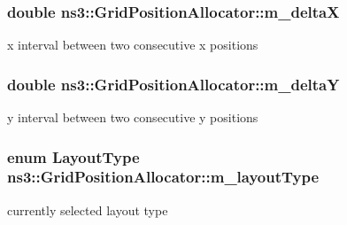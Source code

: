 \subsubsection[{\texorpdfstring{m\+\_\+deltaX}{m_deltaX}}]{\setlength{\rightskip}{0pt plus 5cm}double ns3\+::\+Grid\+Position\+Allocator\+::m\+\_\+deltaX\hspace{0.3cm}{\ttfamily [private]}}\hypertarget{classns3_1_1GridPositionAllocator_a09ae12ea1721ea8c9ad0ac2ea268560e}{}\label{classns3_1_1GridPositionAllocator_a09ae12ea1721ea8c9ad0ac2ea268560e}


x interval between two consecutive x positions 

\subsubsection[{\texorpdfstring{m\+\_\+deltaY}{m_deltaY}}]{\setlength{\rightskip}{0pt plus 5cm}double ns3\+::\+Grid\+Position\+Allocator\+::m\+\_\+deltaY\hspace{0.3cm}{\ttfamily [private]}}\hypertarget{classns3_1_1GridPositionAllocator_a1e266d88a85f5cf399e5ff5762c23b83}{}\label{classns3_1_1GridPositionAllocator_a1e266d88a85f5cf399e5ff5762c23b83}


y interval between two consecutive y positions 

\subsubsection[{\texorpdfstring{m\+\_\+layout\+Type}{m_layoutType}}]{\setlength{\rightskip}{0pt plus 5cm}enum {\bf Layout\+Type} ns3\+::\+Grid\+Position\+Allocator\+::m\+\_\+layout\+Type\hspace{0.3cm}{\ttfamily [private]}}\hypertarget{classns3_1_1GridPositionAllocator_a79b8999013bc912f50f47fbf43aa2654}{}\label{classns3_1_1GridPositionAllocator_a79b8999013bc912f50f47fbf43aa2654}


currently selected layout type 

